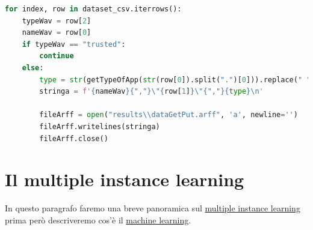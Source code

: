 \begin{lstlisting}[language=Python, caption=Application Get or Put control, label = lst:splitFun]
    for index, row in dataset_csv.iterrows():  
    typeWav = row[2]  
    nameWav = row[0]
    if typeWav == "trusted":
        continue
    else:
        type = str(getTypeOfApp(str(row[0]).split(".")[0])).replace(" ", "_")
        stringa = f'{nameWav}{","}\"{row[1]}\"{","}{type}\n'

        fileArff = open("results\\dataGetPut.arff", 'a', newline='')
        fileArff.writelines(stringa)
        fileArff.close()
\end{lstlisting}

\section{Il multiple instance learning}
In questo paragrafo faremo una breve panoramica sul \hyperref[subsub:mil]{multiple instance learning} prima però descriveremo  cos'è il  \hyperref[subsub:ml]{machine learning}. 

